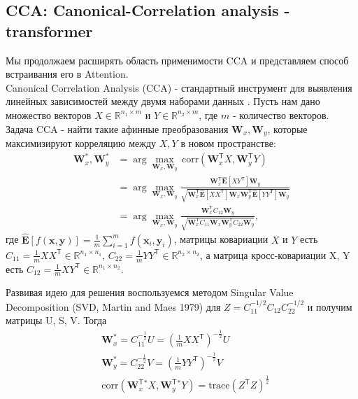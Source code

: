 \documentclass[a4paper,14pt]{article}
\newcommand{\bx}{\mathbf{x}}
\newcommand{\by}{\mathbf{y}}
\newcommand{\bW}{\mathbf{W}}
\newcommand{\bE}{\mathbf{E}}
\newcommand{\dR}{\mathbb{R}}
\newcommand{\T}{^{\mathsf{T}}}
\theoremstyle{plain} %
\theoremstyle{definition} %
\theoremstyle{remark} %
\begin{document}
        \subsection{CCA: Canonical-Correlation analysis - transformer}
        Мы продолжаем расширять область применимости CCA и представляем способ встраивания его в Attention.\\
        Canonical Correlation Analysis (CCA) - стандартный инструмент для выявления линейных зависимостей между двумя наборами данных .\cite{6788402} Пусть нам дано множество векторов $X\in \dR^{n_1\times m}$ и $Y\in \dR^{n_2\times m}$, где $m$ - количество векторов. Задача CCA - найти такие афинные преобразования $\bW_x, \bW_y$, которые максимизируют корреляцию между $X, Y$ в новом пространстве:
        \begin{equation}
            \begin{aligned}
            \bW^{*}_x, \bW^{*}_y &= \arg\max_{\bW_x, \bW_y} \, \text{corr}(\bW_x\T X, \bW_y\T Y) \\
            &= \arg\max_{\bW_x, \bW_y}\frac{\bW_x\T \hat{\bE}[XY\T] \bW_y}{\sqrt{\bW_x\T \hat{\bE}[XX\T] \bW_x \bW_y\T \hat{\bE}[YY\T] \bW_y}} \\
            &= \arg\max_{\bW_x, \bW_y}\frac{\bW_x\T C_{12} \bW_y}{\sqrt{\bW_x\T C_{11} \bW_x \bW_y\T C_{22} \bW_y}},
            \end{aligned}
        \end{equation}
        где $\hat{\bE}[f(\bx, \by)] = \frac{1}{m}\sum\limits_{i=1}^{m}f(\bx_i, \by_i)$, матрицы ковариации $X$ и $Y$ есть $C_{11} = \frac{1}{m}XX\T \in \dR^{n_1\times n_1}$, $C_{22} = \frac{1}{m}YY\T \in \dR^{n_2\times n_2}$, а матрица кросс-ковариации X, Y есть $C_{12} = \frac{1}{m}XY\T \in\dR^{n_1\times n_2}$.

        Развивая идею \cite{sun2020learning} для решения воспользуемся методом Singular Value Decomposition (SVD, Martin and Maes 1979) для $Z = C_{11}^{-1/2}C_{12}C_{22}^{-1/2}$ и получим матрицы U, S, V. Тогда
        \begin{equation}
            \begin{aligned}
                &\bW_x^* = C_{11}^{-\frac{1}{2}}U = (\frac{1}{m}XX\T)^{-\frac{1}{2}}U \\
                &\bW_y^* = C_{22}^{-\frac{1}{2}}V = (\frac{1}{m}YY\T)^{-\frac{1}{2}}V \\
                &\text{corr}(\bW_x\T^* X, \bW_y\T^* Y) = \text{trace}(Z\T Z)^{\frac{1}{2}}
            \end{aligned}
        \end{equation}
\end{document}
